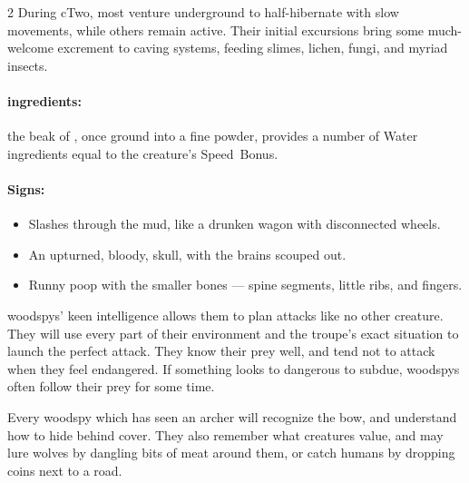 \begin{multicols}{2}
During \gls{cTwo}, most venture underground to half-hibernate with slow movements, while others remain active.
Their initial excursions bring some much-welcome excrement to caving systems, feeding slimes, lichen, fungi, and myriad insects.

\paragraph{\Glspl{ingredient}:}
the beak of , once ground into a fine powder, provides a number of Water \glspl{ingredient} equal to the creature's Speed~Bonus.

\paragraph{Signs:}
\begin{itemize}
  \item
  Slashes through the mud, like a drunken wagon with disconnected wheels.
  \item
  An upturned, bloody, skull, with the brains scouped out.
  \item
  Runny poop with the smaller bones --- spine segments, little ribs, and fingers.
\end{itemize}

\showEnc[\E]
\noindent
\Glspl{woodspy}' keen intelligence allows them to plan attacks like no other creature.
They will use every part of their environment and the troupe's exact situation to launch the perfect attack.
They know their prey well, and tend not to attack when they feel endangered.
If something looks to dangerous to subdue, \glspl{woodspy} often follow their prey for some time.

Every \gls{woodspy} which has seen an archer will recognize the bow, and understand how to hide behind cover.
They also remember what creatures value, and may lure wolves by dangling bits of meat around them, or catch humans by dropping coins next to a road.

\bigbreak


\end{multicols}
